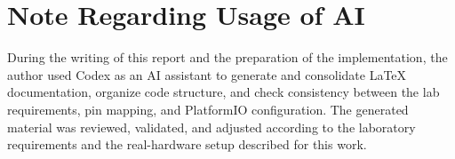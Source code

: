 \section{Note Regarding Usage of AI}

During the writing of this report and the preparation of the implementation, the author used Codex as an AI assistant to generate and consolidate LaTeX documentation, organize code structure, and check consistency between the lab requirements, pin mapping, and PlatformIO configuration. The generated material was reviewed, validated, and adjusted according to the laboratory requirements and the real-hardware setup described for this work.
